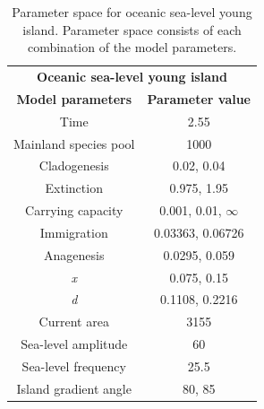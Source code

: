 \begin{table}[h]
    \centering
    \caption{Parameter space for oceanic sea-level young island. Parameter space consists of each combination of the model parameters.}
    \begin{tabular}{ c | c }
        \multicolumn{2}{c}{\textbf{Oceanic sea-level young island}} \\
        \textbf{Model parameters} & \textbf{Parameter value} \\ 
        \hline
        \hline
        Time & 2.55 \\
        \hline
        Mainland species pool & 1000 \\
        \hline
        Cladogenesis & 0.02, 0.04 \\
        \hline
        Extinction & 0.975, 1.95 \\
        \hline
        Carrying capacity & 0.001, 0.01, $\infty$ \\
        \hline
        Immigration & 0.03363, 0.06726 \\
        \hline
        Anagenesis & 0.0295, 0.059 \\
        \hline
        \textit{x} & 0.075, 0.15 \\
        \hline
        \textit{d} & 0.1108, 0.2216 \\
        \hline
        Current area & 3155 \\
        \hline
        Sea-level amplitude & 60 \\
        \hline
        Sea-level frequency & 25.5 \\
        \hline
        Island gradient angle & 80, 85 \\
    \end{tabular}
    \label{tab:oceanic_sea_level_young}
\end{table}

